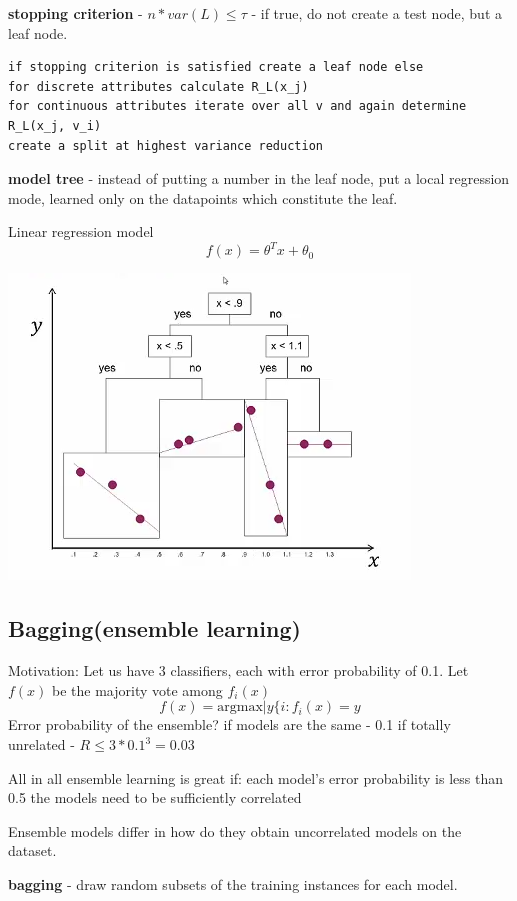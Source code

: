 \documentclass{article}
\newcommand{\argmax}[0]{\text{argmax}}
\newcommand{\para}[0]{\par\vspace{0.2cm}\noindent}
\newcommand{\define}[2]{\textbf{#1} - {#2}.  \para}
\begin{document}
\define{stopping criterion}
           {$n * var(L) \leq \tau$ - if true, do not create a test node, but a leaf node}

\begin{verbatim}
if stopping criterion is satisfied create a leaf node else
for discrete attributes calculate R_L(x_j)
for continuous attributes iterate over all v and again determine R_L(x_j, v_i)
create a split at highest variance reduction
\end{verbatim}

\define{model tree}
           {instead of putting a number in the leaf node, put a local regression mode, learned only on the datapoints which constitute the leaf}

Linear regression model
$$ f(x) = \theta^T x + \theta_0  $$

\includegraphics[height=0.4\textheight]{model_tree}


\subsection{Bagging(ensemble learning)}
Motivation:
Let us have 3 classifiers, each with error probability of 0.1.
Let $f(x)$ be the majority vote among $f_i(x)$
$$ f(x) = \argmax|y \{i: f_i(x) = y $$
Error probability of the ensemble?
    if models are the same - 0.1
    if totally unrelated - $R \leq 3 * 0.1^3 = 0.03$

All in all ensemble learning is great if:
    each model's error probability is less than 0.5
    the models need to be sufficiently correlated

Ensemble models differ in how do they obtain uncorrelated models on the dataset.

\define{bagging}
           {draw random subsets of the training instances for each model}
\end{document}
